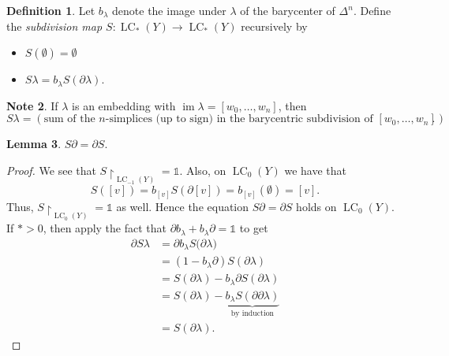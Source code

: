 \documentclass[10pt,letterpaper,cm]{nupset}
\theoremstyle{definition}
\newtheorem{definition}{Definition}[subsection]
\newtheorem{note}[definition]{Note}
\theoremstyle{theorem}
\newtheorem{lemma}[definition]{Lemma}
\theoremstyle{remark}
\newcommand{\1}{\mathbb{1}}
\newcommand{\0}{\vec 0}
\DeclareMathOperator{\im}{im}
\DeclareMathOperator{\lc}{\mathrm{LC}}
\begin{document}
\begin{definition}
Let $b_{\lambda}$ denote the image under $\lambda$ of the barycenter of $\Delta^n$. Define the \textit{subdivision map $S: \lc_{\ast}(Y) \to \lc_{\ast}(Y)$} recursively by
\begin{itemize}
\item $S(\emptyset) = \emptyset$
\item $S\lambda= b_{\lambda}{S(\partial{\lambda})}.$
\end{itemize}
\end{definition}

\begin{note}
If $\lambda$ is an embedding with $\im{\lambda} = \left[w_0, \ldots, w_n\right]$, then $$S\lambda = \left(\text{sum of the }n\text{-simplices (up to sign) in the barycentric subdivision of }\left[w_0, \ldots, w_n\right]\right).$$
\end{note}

\begin{lemma}
$S{\partial} = \partial{S}$.
\end{lemma}
\begin{proof}
We see that $S\restriction_{\lc_{-1}(Y)} = \1$. Also, on $\lc_0(Y)$ we have that $$S([v]) = b_{[v]}S(\partial{[v]}) =b_{[v]}(\emptyset) =[v] .$$ Thus, $S\restriction_{\lc_0(Y)} =\1$ as well. Hence the equation $S{\partial} = \partial{S}$ holds on $\lc_0(Y)$. If ${\ast}>0$, then apply the fact that $\partial{b_{\lambda}} + b_{\lambda}{\partial} = \1$ to get
\begin{align*}
 \partial{S\lambda} & = \partial{b_{\lambda}S(\partial{\lambda}})
 \\ & =  (1- b_{\lambda}{\partial})S(\partial{\lambda})
 \\ & = S(\partial{\lambda}) -b_{\lambda}\partial{S(\partial{\lambda})}
 \\ & = S(\partial{\lambda}) - \underbrace{b_{\lambda}S(\partial{\partial{\lambda}})}_{\text{by induction}}
 \\ & = S(\partial{\lambda}) .
\end{align*}
\end{proof}

\medskip
\end{document}
